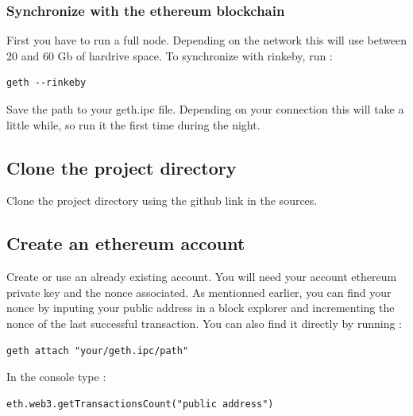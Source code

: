 \documentclass[11pt, a4paper, twoside, openright]{book} %
\begin{document}
\subsubsection*{Synchronize with the ethereum blockchain}
First you have to run a full node. Depending on the network this will use between 20 and 60 Gb of hardrive space. To synchronize with rinkeby, run :
\begin{verbatim}
geth --rinkeby
\end{verbatim}
Save the path to your geth.ipc file. 
Depending on your connection this will take a little while, so run it the first time during the night.
\subsection*{Clone the project directory}
Clone the project directory using the github link in the sources. 
\subsection*{Create an ethereum account}
Create or use an already existing account. You will need your account ethereum private key and the nonce associated. As mentionned earlier, you can find your nonce by inputing your public address in a block explorer and incrementing the nonce of the last successful transaction. You can also find it directly by running : 
\begin{verbatim}
geth attach "your/geth.ipc/path"
\end{verbatim}  
In the console type : 
\begin{verbatim}
eth.web3.getTransactionsCount("public address")
\end{verbatim}
\end{document}
